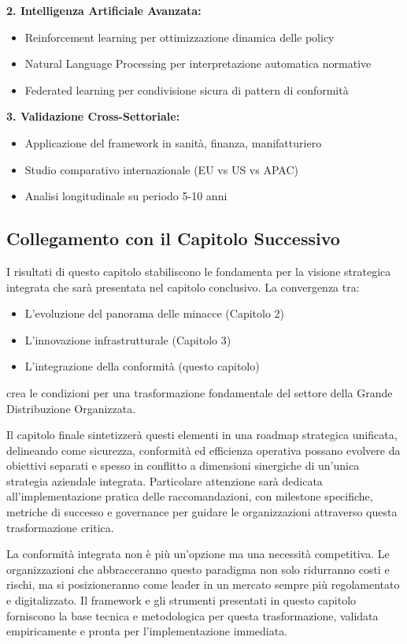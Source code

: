 \textbf{2. Intelligenza Artificiale Avanzata:}
\begin{itemize}
    \item Reinforcement learning per ottimizzazione dinamica delle policy
    \item Natural Language Processing per interpretazione automatica normative
    \item Federated learning per condivisione sicura di pattern di conformità
\end{itemize}

\textbf{3. Validazione Cross-Settoriale:}
\begin{itemize}
    \item Applicazione del framework in sanità, finanza, manifatturiero
    \item Studio comparativo internazionale (EU vs US vs APAC)
    \item Analisi longitudinale su periodo 5-10 anni
\end{itemize}

\subsection{Collegamento con il Capitolo Successivo}

I risultati di questo capitolo stabiliscono le fondamenta per la visione strategica integrata che sarà presentata nel capitolo conclusivo. La convergenza tra:
\begin{itemize}
    \item L'evoluzione del panorama delle minacce (Capitolo 2)
    \item L'innovazione infrastrutturale (Capitolo 3)
    \item L'integrazione della conformità (questo capitolo)
\end{itemize}

crea le condizioni per una trasformazione fondamentale del settore della Grande Distribuzione Organizzata.

Il capitolo finale sintetizzerà questi elementi in una roadmap strategica unificata, delineando come sicurezza, conformità ed efficienza operativa possano evolvere da obiettivi separati e spesso in conflitto a dimensioni sinergiche di un'unica strategia aziendale integrata. Particolare attenzione sarà dedicata all'implementazione pratica delle raccomandazioni, con milestone specifiche, metriche di successo e governance per guidare le organizzazioni attraverso questa trasformazione critica.

La conformità integrata non è più un'opzione ma una necessità competitiva. Le organizzazioni che abbracceranno questo paradigma non solo ridurranno costi e rischi, ma si posizioneranno come leader in un mercato sempre più regolamentato e digitalizzato. Il framework e gli strumenti presentati in questo capitolo forniscono la base tecnica e metodologica per questa trasformazione, validata empiricamente e pronta per l'implementazione immediata.

\printbibliography[
    heading=subbibliography,
]
\endrefsection %